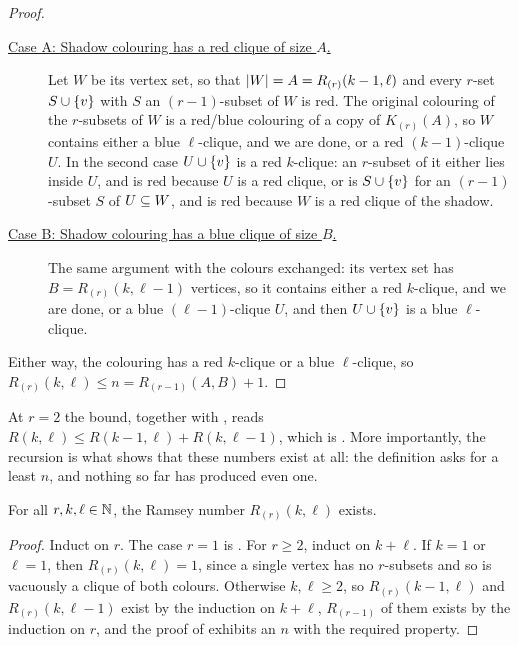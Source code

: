 \begin{proof}
    \begin{description}
        \item[\underline{Case A: Shadow colouring has a red clique of size $A$.}] Let $W$ be its vertex set, so that $\left\lvert W \right\rvert = A = R_{(r)}(k - 1, \ell)$ and every $r$-set $S \cup \left\{ v \right\}$ with $S$ an $(r - 1)$-subset of $W$ is red. The original colouring of the $r$-subsets of $W$ is a red/blue colouring of a copy of $K_{(r)}(A)$, so $W$ contains either a blue $\ell$-clique, and we are done, or a red $(k - 1)$-clique $U$. In the second case $U \cup \left\{ v \right\}$ is a red $k$-clique: an $r$-subset of it either lies inside $U$, and is red because $U$ is a red clique, or is $S \cup \left\{ v \right\}$ for an $(r - 1)$-subset $S$ of $U \subseteq W$, and is red because $W$ is a red clique of the shadow.
        \item[\underline{Case B: Shadow colouring has a blue clique of size $B$.}] The same argument with the colours exchanged: its vertex set has $B = R_{(r)}(k, \ell - 1)$ vertices, so it contains either a red $k$-clique, and we are done, or a blue $(\ell - 1)$-clique $U$, and then $U \cup \left\{ v \right\}$ is a blue $\ell$-clique.
    \end{description}

    Either way, the colouring has a red $k$-clique or a blue $\ell$-clique, so $R_{(r)}(k, \ell) \leq n = R_{(r - 1)}(A, B) + 1$.
\end{proof}

At $r = 2$ the bound, together with , reads $R(k, \ell) \leq R(k - 1, \ell) + R(k, \ell - 1)$, which is . More importantly, the recursion is what shows that these numbers exist at all: the definition asks for a least $n$, and nothing so far has produced even one.

\begin{boxcorollary} \label{Ch6:Cor:Hypergraph_Ramsey_Finite}
    For all $r, k, \ell \in \mathbb{N}$, the Ramsey number $R_{(r)}(k, \ell)$ exists.
\end{boxcorollary}
\begin{proof}
    Induct on $r$. The case $r = 1$ is . For $r \geq 2$, induct on $k + \ell$. If $k = 1$ or $\ell = 1$, then $R_{(r)}(k, \ell) = 1$, since a single vertex has no $r$-subsets and so is vacuously a clique of both colours. Otherwise $k, \ell \geq 2$, so $R_{(r)}(k - 1, \ell)$ and $R_{(r)}(k, \ell - 1)$ exist by the induction on $k + \ell$, $R_{(r - 1)}$ of them exists by the induction on $r$, and the proof of  exhibits an $n$ with the required property.
\end{proof}

